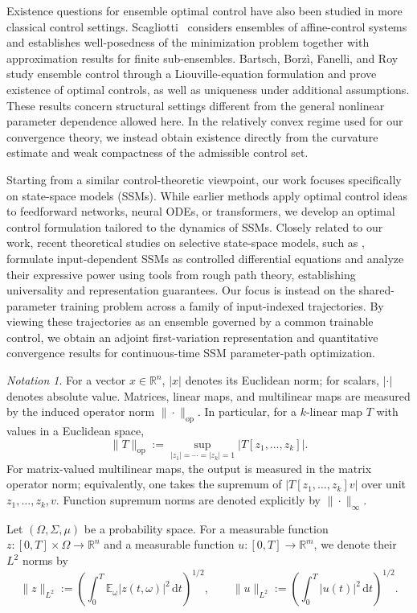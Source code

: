 \documentclass[11pt]{amsart}
\numberwithin{equation}{section} %
\newcommand{\dd}{\mathrm{d}}
\theoremstyle{remark}
\newtheorem*{notation}{Notation}
\begin{document}
Existence questions for ensemble optimal control have also been studied in more
classical control settings. Scagliotti~\cite{scagliotti2023optimal} considers
ensembles of affine-control systems and establishes well-posedness of the
minimization problem together with approximation results for finite
sub-ensembles. Bartsch, Borz\`i, Fanelli, and Roy~\cite{bartsch2019brockett}
study ensemble control through a Liouville-equation formulation and prove
existence of optimal controls, as well as uniqueness under additional
assumptions. These results concern structural settings different from the
general nonlinear parameter dependence allowed here. In the relatively convex
regime used for our convergence theory, we instead obtain existence directly
from the curvature estimate and weak compactness of the admissible control set.

Starting from a similar control-theoretic viewpoint, our work focuses specifically on state-space models (SSMs). While earlier methods apply optimal control ideas to feedforward networks, neural ODEs, or transformers, we develop an optimal control formulation tailored to the dynamics of SSMs. 
Closely related to our work, recent theoretical studies on selective state-space models, such as \cite{muca2024theoretical}, formulate input-dependent SSMs as controlled differential equations and analyze their expressive power using tools from rough path theory, establishing universality and representation guarantees. Our focus is instead on the shared-parameter training problem across a family of input-indexed trajectories. By viewing these trajectories as an ensemble governed by a common trainable control, we obtain an adjoint first-variation representation and quantitative convergence results for continuous-time SSM parameter-path optimization.

\begin{notation}
    For a vector $x\in\mathbb R^n$, $|x|$ denotes its Euclidean norm; for scalars, $|\cdot|$ denotes absolute value. Matrices, linear maps, and multilinear maps are measured by the induced operator norm $\|\cdot\|_{\mathrm{op}}$. In particular, for a $k$-linear map $T$ with values in a Euclidean space,
    \[
        \|T\|_{\mathrm{op}}
        :=\sup_{|z_1|=\cdots=|z_k|=1}|T[z_1,\ldots,z_k]|.
    \]
    For matrix-valued multilinear maps, the output is measured in the matrix operator norm; equivalently, one takes the supremum of $|T[z_1,\ldots,z_k]v|$ over unit $z_1,\ldots,z_k,v$. Function supremum norms are denoted explicitly by $\|\cdot\|_\infty$.

    Let $(\Omega, \Sigma, \mu)$ be a probability space. For a measurable function $z:[0,T]\times\Omega\to\mathbb R^n$ and a measurable function $u:[0,T] \to \mathbb{R}^m$, we denote their $L^2$ norms by
    \[
    \|z\|_{L^2}:=\left(\int_0^T\mathbb E_\omega|z(t,\omega)|^2\,\dd t\right)^{1/2},
    \qquad
    \|u\|_{L^2}:=\left(\int_0^T|u(t)|^2\,\dd t\right)^{1/2}.
    \]
\end{notation}
\end{document}
